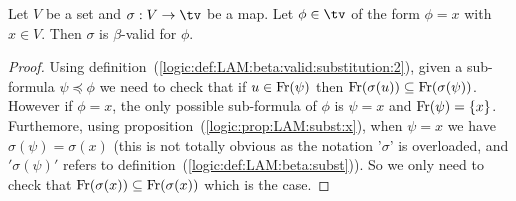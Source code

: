 \begin{prop}\label{logic:prop:LAM:beta:valid:recursion:x:2}
    Let $V$ be a set and $\sigma:V\to\tv$ be a map. Let $\phi\in\tv$
    of the form $\phi=x$ with $x\in V$. Then $\sigma$ is $\beta$-valid
    for $\phi$.
\end{prop}
\begin{proof}
    Using definition~(\ref{logic:def:LAM:beta:valid:substitution:2}), given
    a sub-formula $\psi\preceq\phi$ we need to check that if $u\in\mbox{\rm Fr}(\psi)$
    then $\mbox{\rm Fr}(\sigma(u))\subseteq\mbox{\rm Fr}(\sigma(\psi))$. However if $\phi=x$,
    the only possible sub-formula of $\phi$ is $\psi=x$ and $\mbox{\rm Fr}(\psi)=\{x\}$.
    Furthemore, using proposition~(\ref{logic:prop:LAM:subst:x}), when 
    $\psi=x$ we have $\sigma(\psi)=\sigma(x)$ (this is not totally obvious as
    the notation '$\sigma$' is overloaded, and $'\sigma(\psi)'$ refers 
    to definition~(\ref{logic:def:LAM:beta:subst})). So we only need to check
    that $\mbox{\rm Fr}(\sigma(x))\subseteq\mbox{\rm Fr}(\sigma(x))$ which is the case.
\end{proof}

